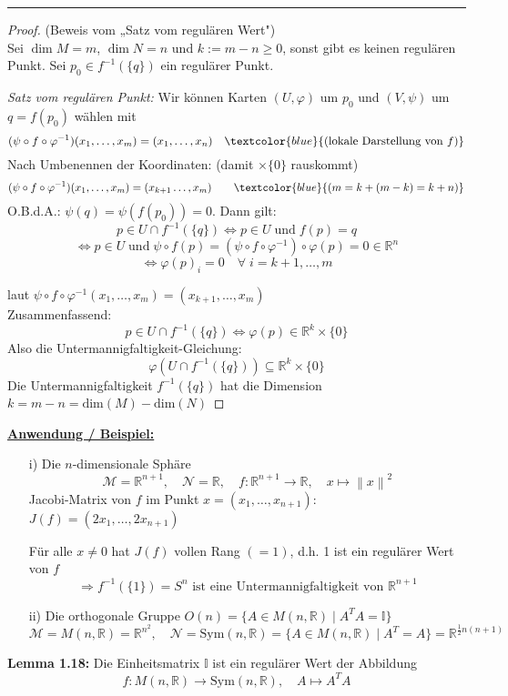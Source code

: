 \documentclass[fleqn, 12pt, letterpaper]{article}
\newcommand{\txt}[1]{\text{#1}}
\newcommand\norm[1]{\left\lVert#1\right\rVert}
\begin{document}
\vspace{0.5cm}
\hrule
\vspace{0.5cm}
\begin{proof}
  (Beweis vom „Satz vom regulären Wert")\\
  Sei $\dim M = m$, $\dim N = n$ und $k := m - n \geq 0$, sonst gibt es keinen regulären Punkt. Sei $p_0 \in f^{-1}(\{q\})$ ein regulärer Punkt.

  \textit{Satz vom regulären Punkt:} Wir können Karten $(U, \varphi)$ um $p_0$ und $(V, \psi)$ um $q = f(p_0)$ wählen mit
  \[
  (\psi \circ f \circ \varphi^{-1})(x_1,\dots,x_m) = (x_1,\dots,x_n) \quad \textcolor{blue}{\text{(lokale Darstellung von }f\text{)}}
  \]
  Nach Umbenennen der Koordinaten: (damit $\times \{0\}$ rauskommt)
  \[
  (\psi \circ f \circ \varphi^{-1})(x_1, \dots, x_m) = (x_{k+1} \dots, x_m)\qquad \textcolor{blue}{(m = k + (m - k) = k + n)}
  \]
  O.B.d.A.: \quad \(\psi(q) = \psi(f(p_0)) = 0\). Dann gilt: 
  \[
  p \in U \cap f^{-1}(\{q\}) 
  \iff 
  p \in U\; \text{und} \; f(p)=q 
  \]
  \[
  \iff p \in U \;\txt{und}\;\psi\circ f(p)=(\psi\circ f\circ\varphi^{-1})\circ\varphi(p)=0\in \mathbb{R}^n
  \]
  \[
  \iff \varphi(p)_i=0\quad \forall \;i=k+1,\dots,m
  \]

  laut \(\psi\circ f \circ \varphi^{-1} (x_1, \dots, x_m) = (x_{k+1}, \dots, x_m)\)\\
  Zusammenfassend: 
  \[
  p \in U \cap f^{-1}(\{q\}) \iff \varphi(p) \in \mathbb{R}^k\times \{0\}
  \]
  Also die Untermannigfaltigkeit-Gleichung:
  \[
  \varphi(U \cap f^{-1}(\{q\})) \subseteq \mathbb{R}^k\times \{0\}
  \]
  Die Untermannigfaltigkeit \(f^{-1}(\{q\})\) hat die Dimension $k=m-n=\text{dim}(M)-\txt{dim}(N)$
\end{proof}

\textbf{\underline{Anwendung / Beispiel:}}
\begin{enumerate}
  \item[i)] Die $n$-dimensionale Sphäre
  \[
  \mathcal{M} = \mathbb{R}^{n+1}, \quad \mathcal{N} = \mathbb{R}, \quad f : \mathbb{R}^{n+1} \to \mathbb{R}, \quad x \mapsto \norm{x}^2
  \]
  Jacobi-Matrix von \( f \) im Punkt \( x = (x_1, \dots, x_{n+1}) \): \quad \( J(f) = (2x_1, \dots, 2x_{n+1}) \)

  Für alle \( x \neq 0 \) hat \( J(f) \) vollen Rang \( (=1) \), d.h. 1 ist ein regulärer Wert von \( f \)
  \[
  \Rightarrow f^{-1}(\{1\}) = S^n \text{ ist eine Untermannigfaltigkeit von } \mathbb{R}^{n+1}
  \]
  \item[ii)] Die orthogonale Gruppe \(O(n) = \{ A \in M(n,\mathbb{R}) \mid A^TA=\mathbb{I} \}\)
  \[
  \mathcal{M} = M(n,\mathbb{R}) = \mathbb{R}^{n^2}, \quad \mathcal{N} = \mathrm{Sym}(n,\mathbb{R}) = \{ A \in M(n,\mathbb{R}) \mid A^T=A\} = \mathbb{R}^{\frac{1}{2}n(n+1)}
  \]
\end{enumerate}
\textbf{Lemma 1.18:} Die Einheitsmatrix \(\mathbb{I}\) ist ein regulärer Wert der Abbildung
\[
f : M(n,\mathbb{R}) \to \mathrm{Sym}(n,\mathbb{R}), \quad A \mapsto A^T A
\]
\end{document}
